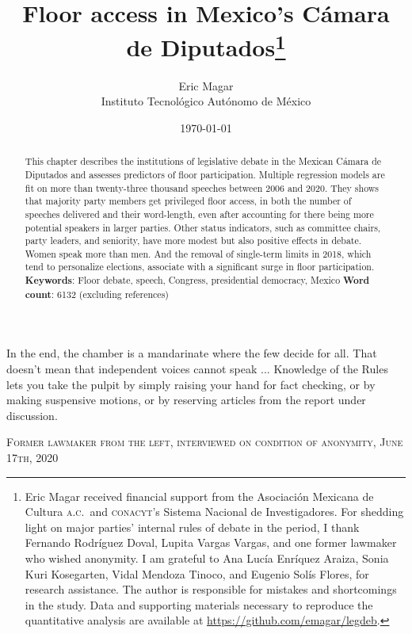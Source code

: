 \documentclass[letter,12pt]{article}
\begin{document}
\title{Floor access in Mexico's Cámara de Diputados\thanks{Eric Magar received financial support from the Asociaci\'on Mexicana de Cultura \textsc{a.c.}\ and \textsc{conacyt}'s Sistema Nacional de Investigadores. For shedding light on major parties' internal rules of debate in the period, I thank Fernando Rodríguez Doval, Lupita Vargas Vargas, and one former lawmaker who wished anonymity. I am grateful to Ana Lucía Enríquez Araiza, Sonia Kuri Kosegarten, Vidal Mendoza Tinoco, and Eugenio Solís Flores, for research assistance. The author is responsible for mistakes and shortcomings in the study. Data and supporting materials necessary to reproduce the quantitative analysis are available at \url{https://github.com/emagar/legdeb}.}}
\author{Eric Magar \\ Instituto Tecnológico Autónomo de México}
\date{\today}
\maketitle




\begin{abstract}
\noindent This chapter describes the institutions of legislative debate in the Mexican Cámara de Diputados and assesses predictors of floor participation. Multiple regression models are fit on more than twenty-three thousand speeches between 2006 and 2020. They shows that majority party members get privileged floor access, in both the number of speeches delivered and their word-length, even after accounting for there being more potential speakers in larger parties. Other status indicators, such as committee chairs, party leaders, and seniority, have more modest but also positive effects in debate. Women speak more than men. And the removal of single-term limits in 2018, which tend to personalize elections, associate with a significant surge in floor participation. 
\newline
\newline
\textbf{Keywords}: Floor debate, speech, Congress, presidential democracy, Mexico
\newline
\newline
\textbf{Word count}: 6132 (excluding references)
\end{abstract}

\newpage

\singlespacing
\epigraph{In the end, the chamber is a mandarinate where the few decide for all. That doesn't mean that independent voices cannot speak ... Knowledge of the Rules lets you take the pulpit by simply raising your hand for fact checking, or by making suspensive motions, or by reserving articles from the report under discussion.}%
{\textsc{Former lawmaker from the left, interviewed on condition of anonymity, June 17th, 2020}}
\doublespacing
\end{document}
